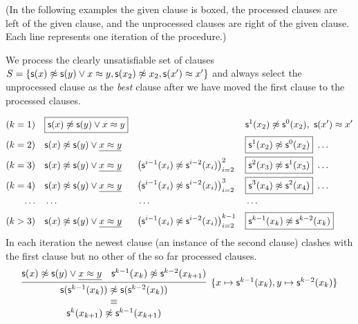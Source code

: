 (In the following examples the given clause is boxed,
the processed clauses are left of the given clause,
and the unprocessed clauses are right of the given clause.
Each line represents one iteration of the procedure.)

\begin{example}
	We process the clearly unsatisfiable set of clauses
	\( S = \{
		\mathsf{s}(x)\not\approx \mathsf{s}(y)\lor {x\approx y},
		\mathsf{s}(x_2)\not\approx x_2, \mathsf{s}(x')\approx x'
		\} \)
	and always select the  unprocessed clause as the \emph{best} clause
	after we have moved the first clause to the processed clauses.

	\begin{align*}
		(k=1)\quad
		&\boxed{\mathsf{s}(x)\not\approx \mathsf{s}(y)\lor {x\approx y}} &
		&&
		&{ \mathsf{s}^1(x_2)\not\approx \mathsf{s}^0(x_2) },\ { \mathsf{s}(x')\approx x' }
		\\
		(k=2)\quad
		&\mathsf{s}(x)\not\approx \mathsf{s}(y)\lor \underline{x\approx y} &
		&&
		&\boxed{ \mathsf{s}^1(x_2)\not\approx \mathsf{s}^0(x_2) }\ \ldots
		\\
		(k=3)\quad
		&\mathsf{s}(x)\not\approx \mathsf{s}(y)\lor \underline{x\approx y} &
		&{\left(\mathsf{s}^{i-1}(x_{i})\not\approx \mathsf{s}^{i-2}(x_{i})\right)}_{i=2}^{2} &
		&\boxed{ \mathsf{s}^2(x_3)\not\approx \mathsf{s}^1(x_3) }\ \ldots
		\\
		(k=4)\quad
		&\mathsf{s}(x)\not\approx \mathsf{s}(y)\lor \underline{x\approx y} &
		&{\left(\mathsf{s}^{i-1}(x_{i})\not\approx \mathsf{s}^{i-2}(x_{i})\right)}_{i=2}^{3} &
		&\boxed{ \mathsf{s}^3(x_4)\not\approx \mathsf{s}^2(x_4) }\ \ldots
		\\
		\cdots\quad & \cdots && \cdots && \cdots
		\\
		(k>3)\quad
		&\mathsf{s}(x)\not\approx \mathsf{s}(y)\lor \underline{x\approx y} &
		&{\left(\mathsf{s}^{i-1}(x_{i})\not\approx \mathsf{s}^{i-2}(x_{i})\right)}_{i=2}^{k-1} &
		&\boxed{ \mathsf{s}^{k-1}(x_{k})\not\approx \mathsf{s}^{k-2}(x_{k}) }
		\end{align*}
		In each iteration the newest clause
		(an instance of the second clause)
		clashes with the first clause but no other of the so far processed clauses.
		\begin{gather*}
			\infer[
				\{x\mapsto\msucc^{k-1}(x_{k}),
				y\mapsto\msucc^{k-2}(x_{k})\}
				]{
					\begin{array}{c}
					\msucc(\msucc^{k-1}(x_{k}))\mNE \msucc(\msucc^{k-2}(x_{k}))
					\\ \equiv \\
					\msucc^{k}(x_{k+1})\mNE \msucc^{k-1}(x_{k+1})
					\end{array}
				}{
				\msucc(x)\mNE \msucc(y)\lor \underline{x\mEQ y} &
				\msucc^{k-1}(x_{k})\mNE \msucc^{k-2}(x_{k+1})
			}
		\end{gather*}
\end{example}



